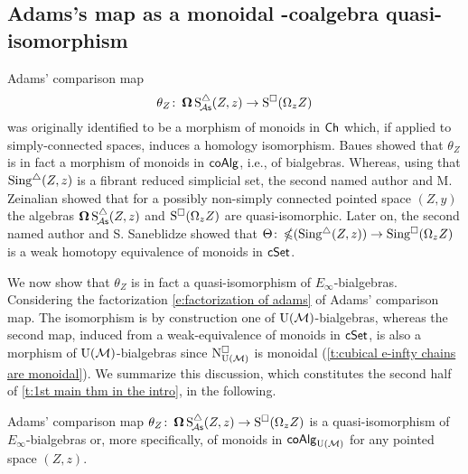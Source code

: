 \subsection{Adams's map as a monoidal \pdfEinfty-coalgebra quasi-isomorphism}

Adams' comparison map
\[
\theta_Z \colon \operatorname{\mathbf{\Omega}} \operatorname{S^{\triangle}_{\!{\mathcal{A}\mathsf{s}}}}(Z,z) \to \operatorname{S^{\square}}(\Omega_z Z)
\]
was originally identified to be a morphism of monoids in $\mathsf{Ch}$ which, if applied to simply-connected spaces, induces a homology isomorphism.
Baues showed that $\theta_Z$ is in fact a morphism of monoids in $\mathsf{coAlg}$, i.e., of bialgebras.
Whereas, using that $\operatorname{Sing^{\triangle}}(Z,z)$ is a fibrant reduced simplicial set, the second named author and M. Zeinalian \cite{rivera2018cubical} showed that for a possibly non-simply connected pointed space $(Z,y)$ the algebras $\operatorname{\mathbf{\Omega}} \operatorname{S^{\triangle}_{\!{\mathcal{A}\mathsf{s}}}}(Z,z)$ and $\operatorname{S^{\square}}(\Omega_zZ)$ are quasi-isomorphic.
Later on, the second named author and S. Saneblidze
\cite{rivera2019path} showed that $\Theta \colon \operatorname{\mathbb{\Omega}}(\operatorname{Sing^{\triangle}}(Z,z)) \to \operatorname{Sing^{\square}}(\Omega_z Z)$ is a weak homotopy equivalence of monoids in $\mathsf{cSet}$.

We now show that $\theta_Z$ is in fact a quasi-isomorphism of $E_{\infty}$-bialgebras.
Considering the factorization \eqref{e:factorization of adams} of Adams' comparison map.
The isomorphism is by construction one of ${\operatorname{U}(\mathcal{M})}$-bialgebras, whereas the second map, induced from a weak-equivalence of monoids in $\mathsf{cSet}$, is also a morphism of ${\operatorname{U}(\mathcal{M})}$-bialgebras
since $\operatorname{N^{\square}_{{\operatorname{U}(\mathcal{M})}}}$ is monoidal (\cref{t:cubical e-infty chains are monoidal}).
We summarize this discussion, which constitutes the second half of \cref{t:1st main thm in the intro}, in the following.

\begin{lemma}\label{l:adams comparison is an e-infty bialgebra map}
	Adams' comparison map $\theta_Z \colon \operatorname{\mathbf{\Omega}} \operatorname{S^{\triangle}_{\!{\mathcal{A}\mathsf{s}}}}(Z,z) \to \operatorname{S^{\square}}(\Omega_z Z)$ is a quasi-isomorphism of $E_{\infty}$-bialgebras or, more specifically, of monoids in $\mathsf{coAlg}_{\operatorname{U}(\mathcal{M})}$ for any pointed space $(Z,z)$.
\end{lemma}